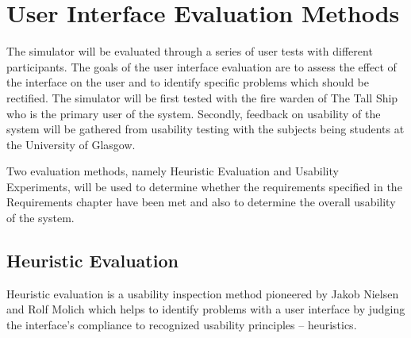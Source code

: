 

%
\section{User Interface Evaluation Methods}
\label{evalmethods}

The simulator will be evaluated through a series of user tests with different participants. The goals of the user interface evaluation are to assess the effect of the interface on the user and to identify specific problems which should be rectified. The simulator will be first tested with the fire warden of The Tall Ship who is the primary user of the system. Secondly, feedback on usability of the system will be gathered from usability testing with the subjects being students at the University of Glasgow.

Two evaluation methods, namely Heuristic Evaluation and Usability Experiments, will be used to determine whether the requirements specified in the Requirements chapter have been met and also to determine the overall usability of the system.

\subsection{Heuristic Evaluation}
Heuristic evaluation is a usability inspection method pioneered by Jakob Nielsen and Rolf Molich which helps to identify problems with a user interface by judging the interface's compliance to recognized usability principles -- heuristics\cite{heuristics}.

